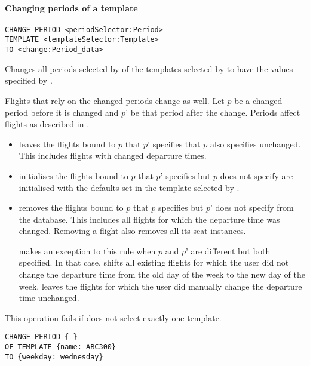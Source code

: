 \paragraph{Changing periods of a template}
\begin{operation}
  \label{op:change_periods}
  \begin{lstlisting}
CHANGE PERIOD <periodSelector:Period>
TEMPLATE <templateSelector:Template>
TO <change:Period_data>
  \end{lstlisting}
\end{operation}
Changes all periods selected by  of the templates selected
by  to have the values specified by .

Flights that rely on the changed periods change as well. Let $p$ be a changed
period before it is changed and $p’$ be that period after the change. Periods
affect flights as described in .

\begin{itemize}
  \item {} leaves the flights bound to $p$ that $p’$
    specifies that $p$ also specifies unchanged. This includes flights with
    changed departure times.
  \item {} initialises the flights bound to $p$ that $p’$
    specifies but $p$ does not specify are initialised with the defaults set in
    the template selected by .
  \item {} removes the flights bound to $p$ that $p$
    specifies but $p’$ does not specify from the database. This includes all
    flights for which the departure time was changed. Removing a flight also
    removes all its seat instances.

     makes an exception to this rule when
    $p$ and $p’$ are different but both specified. In
    that case,  shifts all existing flights for which
    the user did not change the departure time from the old day of the
    week to the new day of the week.  leaves the
    flights for which the user did manually change the departure time unchanged.
\end{itemize}

This operation fails if  does not select exactly one
template.

\begin{texa}
  \begin{lstlisting}
CHANGE PERIOD { }
OF TEMPLATE {name: ABC300}
TO {weekday: wednesday}
  \end{lstlisting}
\end{texa}

